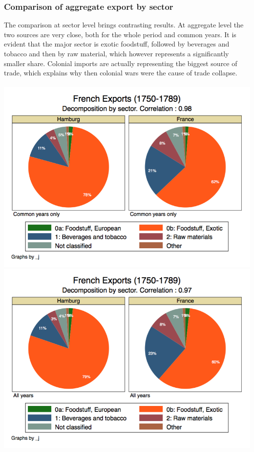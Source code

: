\documentclass[12pt,a4paper,titlepage,english]{article}
\begin{document}
\subsubsection{Comparison of aggregate export by sector}
The comparison at sector level brings contrasting results. At aggregate level the two sources are very close, both for the whole period and common years. It is evident that the major sector is exotic foodstuff, followed by beverages and tobacco and then by raw material, which however represents a significantly smaller share. Colonial imports are actually representing the biggest source of trade, which explains why then colonial wars were the cause of trade collapse. \\~\\
\includegraphics[scale=.28]{commonyears_sector.png}
\includegraphics[scale=.28]{allyears_sector.png}
\end{document}
